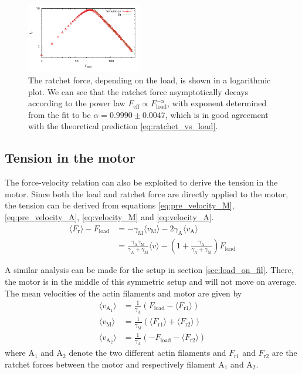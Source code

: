 \documentclass[aps,pre,twocolumn,showpacs,showkeys,superscriptaddress,floatfix]{revtex4-1}
\begin{document}
\begin{figure}[t]
\centering
\includegraphics[width=0.45\textwidth,height=!]{ratchet_force_decay}
\caption{
\label{fig:ratchet_force_decay}
The ratchet force, depending on the load, is shown in a logarithmic plot. 
We can see that the ratchet force asymptotically decays according to the power law $F_\text{eff} \propto F_\text{load}^{-\alpha}$, 
with exponent determined from the fit to be $\alpha = 0.9990 \pm 0.0047$, 
which is in good agreement with the theoretical prediction \eqref{eq:ratchet_vs_load}.
}
\end{figure}

\subsection{Tension in the motor}

The force-velocity relation can also be exploited to derive the tension in the motor. 
Since both the load and ratchet force are directly applied to the motor, the tension can be derived from equations \eqref{eq:pre_velocity_M}, \eqref{eq:pre_velocity_A}, \eqref{eq:velocity_M} and \eqref{eq:velocity_A}.
\begin{align}
\langle F_\text{r} \rangle - F_\text{load} 
&= - \gamma_\text{M} \langle v_\text{M} \rangle - 2\gamma_\text{A} \langle v_\text{A} \rangle \nonumber \\
&= \frac{\gamma_\text{A}\gamma_\text{M}}{\gamma_\text{A}+\gamma_\text{M}}\langle v\rangle - \left(1 + \frac{\gamma_\text{A}}{\gamma_\text{A}+\gamma_\text{M}} \right) F_\text{load}
\label{eq:tension}
\end{align}

A similar analysis can be made for the setup in section \ref{sec:load_on_fil}. 
There, the motor is in the middle of this symmetric setup and will not move on average. 
The mean velocities of the actin filaments and motor are given by
\begin{align*}
\langle v_{\text{A}_1} \rangle &= \frac{1}{\gamma_\text{A} } \left( F_\text{load} - \langle F_\text{r1} \rangle \right) \\
\langle v_\text{M} \rangle &= \frac{1}{\gamma_\text{M} } \left( \langle F_\text{r1} \rangle + \langle F_\text{r2} \rangle \right)\\
\langle v_{\text{A}_2} \rangle &= \frac{1}{ \gamma_\text{A} } \left( - F_\text{load} - \langle F_\text{r2} \rangle \right) 
\end{align*}
where ${\text{A}_1}$ and ${\text{A}_2}$ denote the two different actin filaments and $F_\text{r1}$ and $F_\text{r2}$ are the ratchet forces between the motor and respectively filament ${\text{A}_1}$ and ${\text{A}_2}$. 
\end{document}
